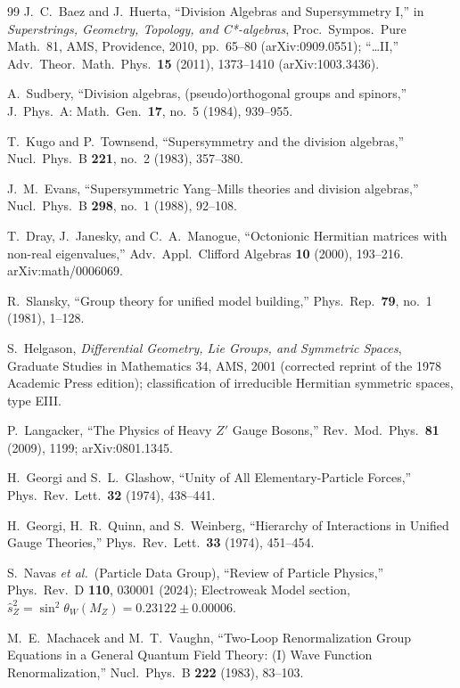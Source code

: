 \documentclass[aps,prresearch,onecolumn,amsmath,amssymb,nofootinbib]{revtex4-2}
\theoremstyle{plain}\newtheorem{theorem}{Theorem}[section]\newtheorem{proposition}[theorem]{Proposition}\newtheorem{lemma}[theorem]{Lemma}\newtheorem{corollary}[theorem]{Corollary}
\theoremstyle{definition}\newtheorem{definition}[theorem]{Definition}\newtheorem{conjecture}[theorem]{Conjecture}
\theoremstyle{remark}\newtheorem{remark}[theorem]{Remark}
\begin{document}
\begin{thebibliography}{99}
 J.~C.~Baez and J.~Huerta, ``Division Algebras and Supersymmetry I,'' in \emph{Superstrings, Geometry, Topology, and C*-algebras}, Proc.\ Sympos.\ Pure Math.\ 81, AMS, Providence, 2010, pp.~65--80 (arXiv:0909.0551); ``\ldots II,'' Adv.\ Theor.\ Math.\ Phys.\ \textbf{15} (2011), 1373--1410 (arXiv:1003.3436).

 A.~Sudbery, ``Division algebras, (pseudo)orthogonal groups and spinors,'' J.\ Phys.\ A: Math.\ Gen.\ \textbf{17}, no.~5 (1984), 939--955.

 T.~Kugo and P.~Townsend, ``Supersymmetry and the division algebras,'' Nucl.\ Phys.\ B \textbf{221}, no.~2 (1983), 357--380.

 J.~M.~Evans, ``Supersymmetric Yang--Mills theories and division algebras,'' Nucl.\ Phys.\ B \textbf{298}, no.~1 (1988), 92--108.

 T.~Dray, J.~Janesky, and C.~A.~Manogue, ``Octonionic Hermitian matrices with non-real eigenvalues,'' Adv.\ Appl.\ Clifford Algebras \textbf{10} (2000), 193--216. arXiv:math/0006069.

 R.~Slansky, ``Group theory for unified model building,'' Phys.\ Rep.\ \textbf{79}, no.~1 (1981), 1--128.

 S.~Helgason, \emph{Differential Geometry, Lie Groups, and Symmetric Spaces}, Graduate Studies in Mathematics 34, AMS, 2001 (corrected reprint of the 1978 Academic Press edition); classification of irreducible Hermitian symmetric spaces, type EIII.

 P.~Langacker, ``The Physics of Heavy $Z'$ Gauge Bosons,'' Rev.\ Mod.\ Phys.\ \textbf{81} (2009), 1199; arXiv:0801.1345.

 H.~Georgi and S.~L.~Glashow, ``Unity of All Elementary-Particle Forces,'' Phys.\ Rev.\ Lett.\ \textbf{32} (1974), 438--441.

 H.~Georgi, H.~R.~Quinn, and S.~Weinberg, ``Hierarchy of Interactions in Unified Gauge Theories,'' Phys.\ Rev.\ Lett.\ \textbf{33} (1974), 451--454.

 S.~Navas \emph{et al.}\ (Particle Data Group), ``Review of Particle Physics,'' Phys.\ Rev.\ D \textbf{110}, 030001 (2024); Electroweak Model section, $\hat s_Z^2=\sin^2\theta_W(M_Z)=0.23122\pm0.00006$.

 M.~E.~Machacek and M.~T.~Vaughn, ``Two-Loop Renormalization Group Equations in a General Quantum Field Theory: (I) Wave Function Renormalization,'' Nucl.\ Phys.\ B \textbf{222} (1983), 83--103.


\end{thebibliography}
\end{document}
